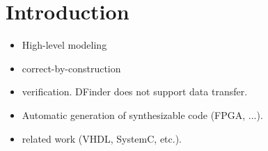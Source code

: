 \section{Introduction}
\label{sect-intro}

\begin{itemize}
\item High-level modeling 
\item correct-by-construction
\item verification. DFinder does not support data transfer. 
\item Automatic generation of synthesizable code  (FPGA, ...).
\item related work (VHDL, SystemC, etc.).
\end{itemize}
